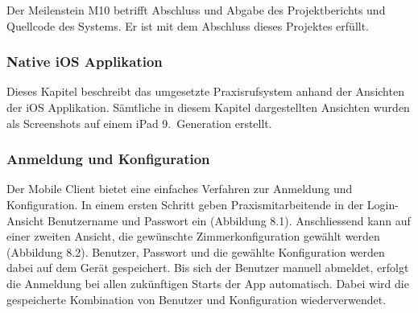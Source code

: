 Der Meilenstein M10 betrifft Abschluss und Abgabe des Projektberichts und Quellcode des Systems.
Er ist mit dem Abschluss dieses Projektes erfüllt.

\subsubsection{Native iOS Applikation}

Dieses Kapitel beschreibt das umgesetzte Praxisrufsystem anhand der Ansichten der iOS Applikation.
Sämtliche in diesem Kapitel dargestellten Ansichten wurden als Screenshots auf einem iPad 9.\ Generation erstellt.

\subsubsection*{Anmeldung und Konfiguration}

Der Mobile Client bietet eine einfaches Verfahren zur Anmeldung und Konfiguration.
In einem ersten Schritt geben Praxismitarbeitende in der Login-Ansicht Benutzername und Passwort ein (Abbildung 8.1).
Anschliessend kann auf einer zweiten Ansicht, die gewünschte Zimmerkonfiguration gewählt werden (Abbildung 8.2).
Benutzer, Passwort und die gewählte Konfiguration werden dabei auf dem Gerät gespeichert.
Bis sich der Benutzer manuell abmeldet, erfolgt die Anmeldung bei allen zukünftigen Starts der App automatisch.
Dabei wird die gespeicherte Kombination von Benutzer und Konfiguration wiederverwendet.

